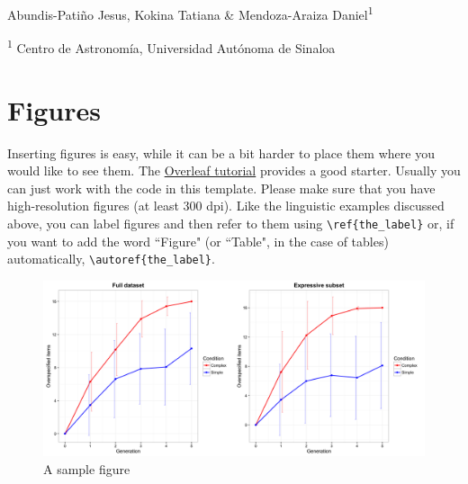 \vspace{30pt}
\begin{center}
    \LARGE{}
\end{center}

\begin{center}
\vspace{4pt}
\large
    Abundis-Patiño Jesus, Kokina Tatiana \& Mendoza-Araiza Daniel\textsuperscript{1}
    
\small
   \textsuperscript{1} Centro de Astronomía, Universidad Autónoma de Sinaloa

\end{center}





\vspace{10pt}







\section{Figures}

Inserting figures is easy, while it can be a bit harder to place them where you would like to see them. The \href{https://www.overleaf.com/learn/latex/Inserting_Images}{Overleaf tutorial} provides a good starter. Usually you can just work with the code in this template. Please make sure that you have high-resolution figures (at least 300 dpi). Like the linguistic examples discussed above, you can label figures and then refer to them using \verb!\ref{the_label}! or, if you want to add the word ``Figure" (or ``Table", in the case of tables) automatically, \verb!\autoref{the_label}!.


\begin{figure}[H]
    \centering
    \includegraphics[width=\textwidth]{Figures/Figure2.png}
    \caption{A sample figure}
    \label{fig:my_first_figure}
\end{figure}

